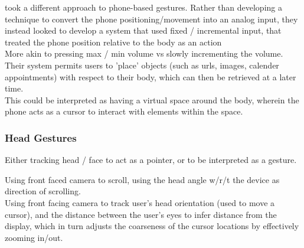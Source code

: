 \cite{chen2012extending} took a different approach to phone-based gestures. Rather than developing a technique to convert the phone positioning/movement into an analog input, they instead looked to develop a system that used fixed / incremental input, that treated the phone position relative to the body as an action\\
More akin to pressing max / min volume vs slowly incrementing the volume.\\
Their system permits users to 'place' objects (such as urls, images, calender appointments) with respect to their body, which can then be retrieved at a later time.\\
This could be interpreted as having a virtual space around the body, wherein the phone acts as a cursor to interact with elements within the space.

\subsubsection{Head Gestures}
Either tracking head / face to act as a pointer, or to be interpreted as a gesture.

\cite{roig2015face} Using front faced camera to scroll, using the head angle w/r/t the device as direction of scrolling.\\


\cite{onuki2016combined} Using front facing camera to track user's head orientation (used to move a cursor), and the distance between the user's eyes to infer distance from the display, which in turn adjusts the coarseness of the cursor locations by effectively zooming in/out.

